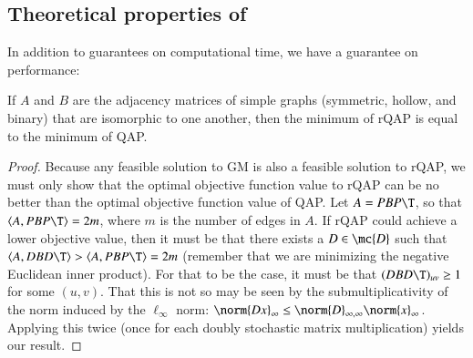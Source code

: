 \documentclass[preprint,11pt]{elsarticle}
\begin{document}
% 


\subsection{Theoretical properties of \FAQ} %
\label{sub:theory}


In addition to guarantees on computational time, we have a guarantee on performance:  
\begin{lem}
	If $A$ and $B$ are the adjacency matrices of simple graphs (symmetric, hollow, and binary) that are isomorphic to one another, then the minimum of rQAP is equal to the minimum of QAP.
\end{lem}
\begin{proof}
Because any feasible solution to GM is also a feasible solution to rQAP, we must only show that the optimal objective function value to rQAP can be no better than the optimal objective function value of QAP.  Let $A=PBP\T$, so that $\langle A, PBP\T\rangle=2m$, where $m$ is the number of edges in $A$.  If rQAP could achieve a lower objective value, then it must be that there exists a $D \in \mc{D}$ such that $\langle A, DBD\T\rangle > \langle A, PBP\T\rangle = 2m$ (remember that we are minimizing the negative Euclidean inner product). For that to be the case, it must be that $(DBD\T)_{uv} \geq 1$ for some $(u,v)$.  That this is not so may be seen by the submultiplicativity of the norm induced by the $\ell_{\infty}$ norm:
$\norm{Dx}_\infty \leq \norm{D}_{\infty,\infty} \norm{x}_\infty$.  Applying this twice (once for each doubly stochastic matrix multiplication) yields our result.
\end{proof}
\end{document}
